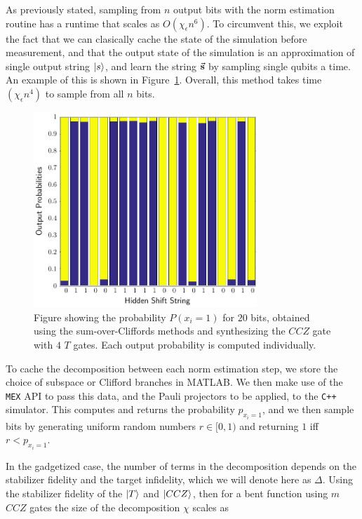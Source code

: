 As previously stated, sampling from $n$ output bits with the norm estimation routine has a runtime that scales as $O\left(\chi_{\epsilon}n^{6}\right)$. To circumvent this, we exploit the fact that we can clasically cache the state of the simulation before measurement, and that the output state of the simulation is an approximation of single output string $\ket{s}$, and learn the string $\va{s}$ by sampling single qubits a time. An example of this is shown in Figure~\ref{fig:hs_readout}. Overall, this method takes time $\left(\chi_{\epsilon}n^{4}\right)$ to sample from all $n$ bits.\par
\begin{figure}[t]
\centering
\includegraphics[width=0.75\textwidth]{Figures/HiddenShiftHistogram.pdf}
\caption{Figure showing the probability $P\left(x_{i}=1\right)$ for $20$ bits, obtained using the sum-over-Cliffords methods and synthesizing the $CCZ$ gate with $4$ $T$ gates. Each output probability is computed individually.}
\label{fig:hs_readout}
\end{figure}
To cache the decomposition between each norm estimation step, we store the choice of subspace or Clifford branches in MATLAB. We then make use of the \texttt{MEX} API to pass this data, and the Pauli projectors to be applied, to the \texttt{C++} simulator. This computes and returns the probability $p_{x_{i}=1}$, and we then sample bits by generating uniform random numbers $r\in [0,1)$ and returning $1$ iff $r<p_{x_{i}=1}$.\par
In the gadgetized case, the number of terms in the decomposition depends on the stabilizer fidelity and the target infidelity, which we will denote here as $\Delta$. Using the stabilizer fidelity of the $\ket{T}$ and $\ket{CCZ}$, then for a bent function using $m$ $CCZ$ gates the size of the decomposition $\chi$ scales as
